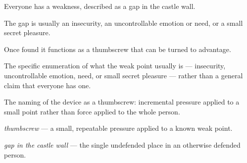 

\begin{distilled}
  \item Everyone has a weakness, described as a gap in the castle wall.
  \item The gap is usually an insecurity, an uncontrollable emotion or need, or a small secret pleasure.
  \item Once found it functions as a thumbscrew that can be turned to advantage.
\end{distilled}

\begin{unique}
  \item The specific enumeration of what the weak point usually is --- insecurity, uncontrollable emotion, need, or small secret pleasure --- rather than a general claim that everyone has one.
  \item The naming of the device as a thumbscrew: incremental pressure applied to a small point rather than force applied to the whole person.
\end{unique}

\begin{terms}
  \item \emph{thumbscrew} --- a small, repeatable pressure applied to a known weak point.
  \item \emph{gap in the castle wall} --- the single undefended place in an otherwise defended person.
\end{terms}
